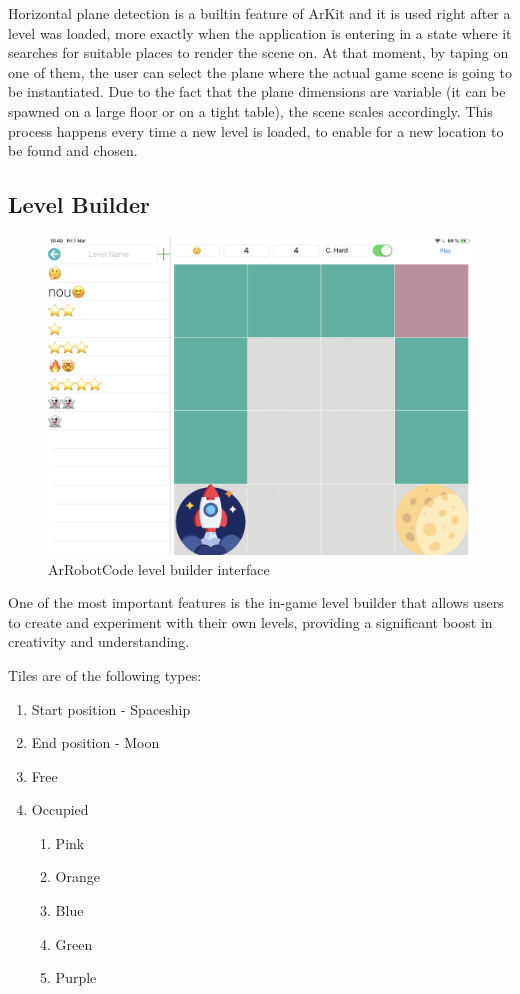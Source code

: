 \documentclass[12 pct]{report}
\begin{document}
Horizontal plane detection is a builtin feature of ArKit and it is used right after a level was loaded, more exactly when the application is entering in a state where it searches for suitable places to render the scene on. At that moment, by taping on one of them, the user can select the plane where the actual game scene is going to be instantiated. Due to the fact that the plane dimensions are variable (it can be spawned on a large floor or on a tight table), the scene scales accordingly. This process happens every time a new level is loaded, to enable for a new location to be found and chosen.

\subsection*{Level Builder}

\begin{figure}[H]
\includegraphics[width=1.0\textwidth]{ArRobotCode3}
\centering
\caption{ArRobotCode level builder interface}
\label{fig:buildinglvl}
\end{figure}

One of the most important features is the in-game level builder that allows users to create and experiment with their own levels, providing a significant boost in creativity and understanding. 

Tiles are of the following types:
\begin{enumerate}
\item Start position - Spaceship
\item End position - Moon
\item Free
\item Occupied
\begin{enumerate}
\item Pink
\item Orange
\item Blue
\item Green
\item Purple
\end{enumerate}
\end{enumerate}
\end{document}
